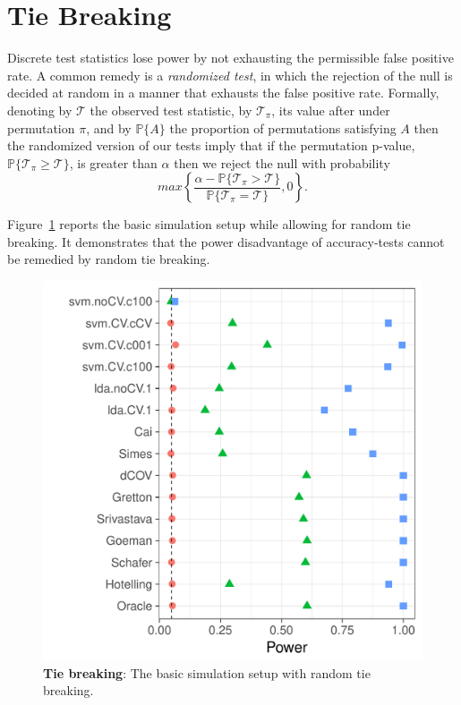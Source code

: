 \documentclass[]{bio}
\begin{document}
\section{Tie Breaking}
\label{sec:ties}

Discrete test statistics lose power by not exhausting the permissible false positive rate. 
A common remedy is a \emph{randomized test}, in which the rejection of the null is decided at random in a manner that exhausts the false positive rate. 
Formally, denoting by $\mathcal{T}$ the observed test statistic, by $\mathcal{T}_\pi$, its value after under permutation $\pi$, and by $\mathbb{P}\{A\}$ the proportion of permutations satisfying $A$ then the randomized version of our tests imply that if the permutation p-value, 
$\mathbb{P}\{\mathcal{T}_\pi \geq \mathcal{T}\}$, 
is greater than  $\alpha$ then we reject the null with probability 
$$ max\left\{\frac{\alpha - \mathbb{P}\{\mathcal{T}_\pi > \mathcal{T}\}}{\mathbb{P}\{\mathcal{T}_\pi = \mathcal{T}\}},0 \right\}.$$

Figure~\ref{fig:file33} reports the basic simulation setup while allowing for random tie breaking. 
It demonstrates that the power disadvantage of accuracy-tests cannot be remedied by random tie breaking.

\begin{figure}[ht]
	\centering
	\includegraphics[width=0.5\columnwidth]{art/file33}
	\caption{\textbf{Tie breaking}: The basic simulation setup with random tie breaking.}
	\label{fig:file33}
\end{figure}












\newpage


\end{document}
